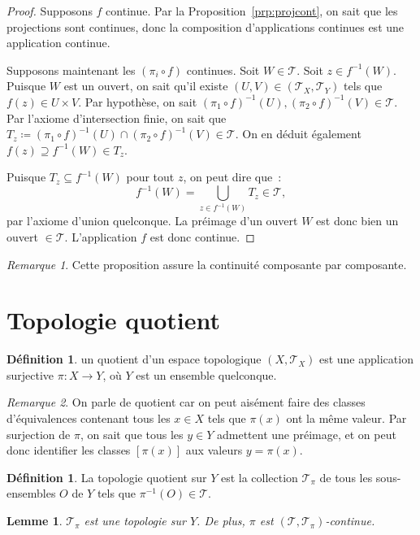 \documentclass{report}
\newtheorem{lem}[thm]{Lemme}
\theoremstyle{definition}
\newtheorem{déf}[thm]{Définition}
\theoremstyle{remark}
\newtheorem*{rmq}{Remarque}
\renewcommand{\top}{\mathcal T}
\begin{document}
		\begin{proof} Supposons $f$ continue. Par la Proposition~\ref{prp:projcont}, on sait que les projections sont continues, donc la composition
		d'applications continues est une application continue.

		Supposons maintenant les $(\pi_i \circ f)$ continues. Soit $W \in \top$. Soit $z \in f^{-1}(W)$. Puisque $W$ est un ouvert, on sait qu'il existe
		$(U, V) \in (\top_X, \top_Y)$ tels que $f(z) \in U \times V$. Par hypothèse, on sait $(\pi_1 \circ f)^{-1}(U), (\pi_2 \circ f)^{-1}(V) \in \top$. Par
		l'axiome d'intersection finie, on sait que $T_z \coloneqq (\pi_1 \circ f)^{-1}(U) \cap (\pi_2 \circ f)^{-1}(V) \in \top$. On en déduit également
		$f(z) \supseteq f^{-1}(W) \in T_z$.

		Puisque $T_z \subseteq f^{-1}(W)$ pour tout $z$, on peut dire que~:
		\[f^{-1}(W) = \bigcup_{z \in f^{-1}(W)}T_z \in \top,\]
		par l'axiome d'union quelconque. La préimage d'un ouvert $W$ est donc bien un ouvert $\in \top$. L'application $f$ est donc continue.
		\end{proof}

		\begin{rmq} Cette proposition assure la continuité composante par composante.
		\end{rmq}

	\section{Topologie quotient}
		\begin{déf} un quotient d'un espace topologique $(X, \top_X)$ est une application surjective $\pi : X \to Y$, où $Y$ est un ensemble quelconque.
		\end{déf}

		\begin{rmq} On parle de quotient car on peut aisément faire des classes d'équivalences contenant tous les $x \in X$ tels que $\pi(x)$ ont la même
		valeur. Par surjection de $\pi$, on sait que tous les $y \in Y$ admettent une préimage, et on peut donc identifier les classes $[\pi(x)]$ aux valeurs
		$y = \pi(x)$.
		\end{rmq}

		\begin{déf} La topologie quotient sur $Y$ est la collection $\top_\pi$ de tous les sous-ensembles $O$ de $Y$ tels que $\pi^{-1}(O) \in \top$.
		\end{déf}

		\begin{lem} $\top_\pi$ est une topologie sur $Y$. De plus, $\pi$ est $(\top, \top_\pi)$-continue.
		\end{lem}
\end{document}
